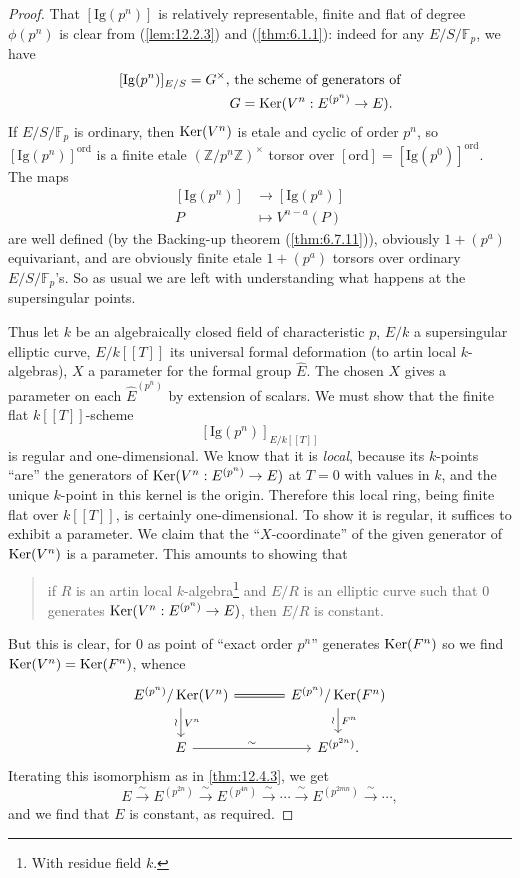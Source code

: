 \begin{proof}
That $[\mathrm{Ig}(p^n)]$ is relatively representable, finite and flat of degree $\phi(p^n)$ is clear from (\ref{lem:12.2.3}) and (\ref{thm:6.1.1}): indeed for any $E/S/\mathbb{F}_p$, we have
\[
\begin{aligned}
[\mathrm{Ig}(p^n)]_{E/S} = G^\times, &\text{ the scheme of generators of} \\
&G = \Ker(V^n : E^{(p^n)} \to E) .
\end{aligned}
\]
If $E/S/\mathbb{F}_p$ is ordinary, then $\operatorname{Ker}(V^n)$ is etale and cyclic of order $p^n$, so $[\mathrm{Ig}(p^n)]^{\mathrm{ord}}$ is a finite etale $(\mathbb{Z}/p^n\mathbb{Z})^\times$ torsor over $[\mathrm{ord}] = [\mathrm{Ig}(p^0)]^{\mathrm{ord}}$.
The maps
\[
\begin{aligned}
{[\mathrm{Ig}(p^n)]} &\to [\mathrm{Ig}(p^a)] \\
P &\mapsto V^{n-a}(P)
\end{aligned}
\]
are well defined (by the Backing-up theorem (\ref{thm:6.7.11})), obviously $1 + (p^a)$ equivariant, and are obviously finite etale $1 + (p^a)$ torsors over ordinary $E/S/\mathbb{F}_p$'s. So as usual we are left with understanding what happens at the supersingular points.

Thus let $k$ be an algebraically closed field of characteristic $p$, $E/k$ a supersingular elliptic curve, $E/k[[T]]$ its universal formal deformation (to artin local $k$-algebras), $X$ a parameter for the formal group $\widehat{E}$. The chosen $X$ gives a parameter on each $\widehat{E}^{(p^n)}$ by extension of scalars. We must show that the finite flat $k[[T]]$-scheme
\[
[\mathrm{Ig}(p^n)]_{E/k[[T]]}
\]
is regular and one-dimensional. We know that it is \emph{local}, because its $k$-points ``are'' the generators of $\operatorname{Ker}(V^n : E^{(p^n)} \to E)$ at $T = 0$ with values in $k$, and the unique $k$-point in this kernel is the origin. Therefore this local ring, being finite flat over $k[[T]]$, is certainly one-dimensional. To show it is regular, it suffices to exhibit a parameter. We claim that the ``$X$-coordinate'' of the given generator of $\operatorname{Ker}(V^n)$ is a parameter. This amounts to showing that
\begin{quote}
if $R$ is an artin local $k$-algebra\footnote{With residue field $k$.} and $E/R$ is an elliptic curve such that $0$ generates $\operatorname{Ker}(V^n : E^{(p^n)} \to E)$, then $E/R$ is constant.
\end{quote}
But this is clear, for $0$ as point of ``exact order $p^n$'' generates $\operatorname{Ker}(F^n)$ so we find $\operatorname{Ker}(V^n) = \operatorname{Ker}(F^n)$, whence
\[
\begin{tikzcd}[row sep=1.8em, column sep=large]
E^{(p^n)}/\Ker(V^n) \arrow[d, "\wr"', "V^n"] \arrow[r, equal] & E^{(p^n)}/\Ker(F^n) \arrow[d, "\wr"', "F^n"] \\
E \arrow[r, "\sim"] & E^{(p^{2n})} .
\end{tikzcd}
\]
Iterating this isomorphism as in \ref{thm:12.4.3}, we get
\[
E \xrightarrow{\ \sim\ } E^{(p^{2n})} \xrightarrow{\ \sim\ } E^{(p^{4n})} \xrightarrow{\ \sim\ } \cdots \xrightarrow{\ \sim\ } E^{(p^{2mn})} \xrightarrow{\ \sim\ } \cdots ,
\]
and we find that $E$ is constant, as required.


\end{proof}
